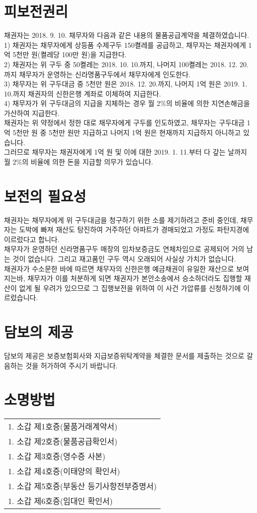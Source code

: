 \documentclass[12pt]{oblivoir}
\def\mysection#1{\hfil #1 \hfil} %
\begin{document}
\section{피보전권리}
  채권자는 2018. 9. 10. 채무자와 다음과 같은 내용의 물품공급계약을 체결하였습니다.\\
  1) 채권자는 채무자에게 상등품 수제구두 150켤레를 공급하고, 채무자는 채권자에게 1억 5천만 원(켤레당 100만 원)을 지급한다.\\
  2) 채권자는 위 구두 중 50켤레는 2018. 10. 10.까지, 나머지 100켤레는 2018. 12. 20.까지 채무자가 운영하는 신라명품구두에서 채무자에게 인도한다.\\
  3) 채무자는 위 구두대금 중 5천만 원은 2018. 12. 20.까지, 나머지 1억 원은 2019. 1. 10.까지 채권자의 신한은행 계좌로 이체하여 지급한다.\\
  4) 채무자가 위 구두대금의 지급을 지체하는 경우 월 2\%의 비율에 의한 지연손해금을 가산하여 지급한다.\\
  채권자는 위 약정에서 정한 대로 채무자에게 구두를 인도하였고, 채무자는 구두대금 1억 5천만 원 중 5천만 원만 지급하고 나머지 1억 원은 현재까지 지급하지 아니하고 있습니다.\\
그러므로 채무자는 채권자에게 1억 원 및 이에 대한 2019. 1. 11.부터 다 갚는 날까지 월 2\%의 비율에 의한 돈을 지급할 의무가 있습니다.
\section{보전의 필요성}
채권자는 채무자에게 위 구두대금을 청구하기 위한 소를 제기하려고 준비 중인데, 채무자는 도박에 빠져 재산도 탕진하여 거주하던 아파트가 경매되었고 가정도 파탄지경에 이르렀다고 합니다.\\ 채무자가 운영하던 신라명품구두 매장의 임차보증금도 연체차임으로 공제되어 거의 남는 것이 없습니다. 그리고 재고품인 구두 역시 오래되어 사실상 가치가 없습니다.\\
채권자가 수소문한 바에 따르면 채무자의 신한은행 예금채권이 유일한 재산으로 보여지는바, 채무자가 이를 처분하게 되면 채권자가 본안소송에서 승소하더라도 집행할 재산이 없게 될 우려가 있으므로 그 집행보전을 위하여 이 사건 가압류를 신청하기에 이르렀습니다.
\section{담보의 제공}
담보의 제공은 보증보험회사와 지급보증위탁계약을 체결한 문서를 제출하는 것으로 갈음하는 것을 허가하여 주시기 바랍니다.
\vspace{5em}
\section*{\mysection{소명방법}}
\vspace{2em}
 \begin{tabu} to \linewidth{X}
    1. 소갑 제1호증(물품거래계약서)\\
    1. 소갑 제2호증(물품공급확인서)\\
    1. 소갑 제3호증(영수증 사본)\\
    1. 소갑 제4호증(이태양의 확인서)\\
    1. 소갑 제5호증(부동산 등기사항전부증명서)\\
    1. 소갑 제6호증(임대인 확인서)
\end{tabu}
\bigskip
\end{document}
